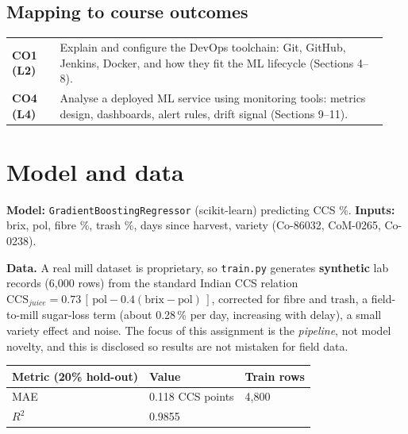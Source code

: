 \documentclass[10pt,a4paper]{article}
\let\oldsection\section
\renewcommand{\section}{\Needspace{14\baselineskip}\oldsection}
\begin{document}
\subsection*{Mapping to course outcomes}
\begin{tabular}{@{}p{0.12\linewidth}p{0.82\linewidth}@{}}
\toprule
\textbf{CO1 (L2)} & Explain and configure the DevOps toolchain: Git, GitHub, Jenkins, Docker, and how they fit the ML lifecycle (Sections 4--8).\\
\textbf{CO4 (L4)} & Analyse a deployed ML service using monitoring tools: metrics design, dashboards, alert rules, drift signal (Sections 9--11).\\
\bottomrule
\end{tabular}

\section{Model and data}
\textbf{Model:} \texttt{GradientBoostingRegressor} (scikit-learn) predicting CCS \%.
\textbf{Inputs:} brix, pol, fibre \%, trash \%, days since harvest, variety (Co-86032, CoM-0265, Co-0238).

\textbf{Data.} A real mill dataset is proprietary, so \texttt{train.py} generates \textbf{synthetic} lab records (6{,}000 rows)
from the standard Indian CCS relation $\mathrm{CCS}_{juice}=0.73\,[\,\mathrm{pol}-0.4(\mathrm{brix}-\mathrm{pol})\,]$, corrected for fibre and
trash, a field-to-mill sugar-loss term (about 0.28\,\% per day, increasing with delay), a small variety effect and noise.
The focus of this assignment is the \emph{pipeline}, not model novelty, and this is disclosed so results are not mistaken for field data.

\begin{center}
\begin{tabular}{lll}
\toprule
\textbf{Metric (20\% hold-out)} & \textbf{Value} & \textbf{Train rows}\\
\midrule
MAE & 0.118 CCS points & 4{,}800\\
$R^2$ & 0.9855 & \\
\bottomrule
\end{tabular}
\end{center}

\end{document}
